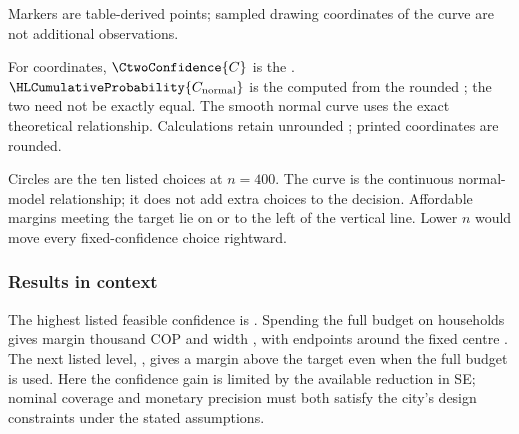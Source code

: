 \begin{landscape}
\begin{minipage}{\linewidth}
\begin{minipage}[t]{.43\linewidth}
Markers are table-derived points; sampled drawing coordinates of the curve are not additional observations.

For  coordinates, $\CtwoConfidence{C}$ is the . $\HLCumulativeProbability{C_{\rm normal}}$ is the  computed from the rounded ; the two need not be exactly equal. The smooth normal curve uses the exact theoretical relationship. Calculations retain unrounded ; printed coordinates are rounded.
\end{minipage}
\end{minipage}
\par\medskip

Circles are the ten listed choices at $n=400$. The curve is the continuous normal-model relationship; it does not add extra choices to the decision. Affordable margins meeting the target lie on or to the left of the vertical line. Lower $n$ would move every fixed-confidence choice rightward.
\end{landscape}
\subsubsection*{Results in context}
The highest listed feasible confidence is . Spending the full budget on  households gives margin  thousand COP and width , with endpoints  around the fixed centre . The next listed level, , gives a margin above the target even when the full budget is used. Here the confidence gain is limited by the available reduction in SE; nominal coverage and monetary precision must both satisfy the city's design constraints under the stated assumptions.

